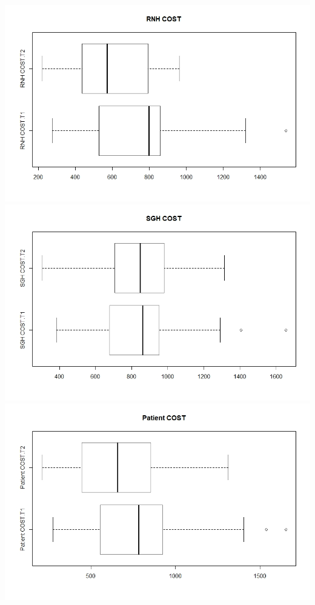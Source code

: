 \documentclass[11pt]{article}
\begin{document}
\includegraphics[width=15cm]{RStudio/jpeg/Box RNH.jpeg}
\includegraphics[width=15cm]{RStudio/jpeg/Box SGH.jpeg}
\includegraphics[width=15cm]{RStudio/jpeg/Box COST.jpeg}
\end{document}

